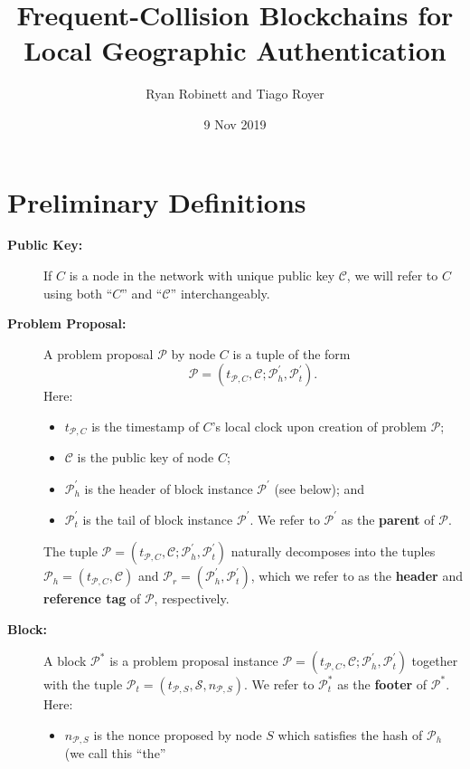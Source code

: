 \documentclass{article}
\title{Frequent-Collision Blockchains for Local Geographic Authentication}
\author{Ryan Robinett and Tiago Royer}
\date{9 Nov 2019}
\begin{document}
\maketitle

\section*{Preliminary Definitions}
\begin{description}
	\item[\textbf{Public Key:}] If $C$ is a node in the network with unique public key
		$\mathcal{C}$, we will refer to $C$ using both ``$C$'' and ``$\mathcal{C}$''
		interchangeably.
	\item[\textbf{Problem Proposal:}] A problem proposal $\mathcal{P}$ by
		node $C$ is a tuple of the form
		$$\mathcal{P}=(t_{\mathcal{P},C},\mathcal{C};\mathcal{P}^\prime_h,\mathcal{P}^\prime_t).$$
		Here:
		\begin{itemize}
			\item $t_{\mathcal{P},C}$ is the timestamp of $C$'s local clock upon
			creation of problem $\mathcal{P}$;
			\item $\mathcal{C}$ is the public key of node $C$;
			\item $\mathcal{P}^\prime_h$ is the header of block instance
			$\mathcal{P}^\prime$ (see below); and
			\item $\mathcal{P}^\prime_t$ is the tail of block instance
			$\mathcal{P}^\prime$. We refer to $\mathcal{P}^\prime$ as
			the \textbf{parent} of $\mathcal{P}$.
		\end{itemize}
		The tuple
		$\mathcal{P}=(t_{\mathcal{P},C},\mathcal{C};\mathcal{P}^\prime_h,\mathcal{P}^\prime_t)$
		naturally decomposes into the tuples
		$\mathcal{P}_h=(t_{\mathcal{P},C},\mathcal{C})$ and
		$\mathcal{P}_r=(\mathcal{P}^\prime_h,\mathcal{P}^\prime_t)$, which we
		refer to as the \textbf{header} and \textbf{reference tag} of $\mathcal{P}$,
		respectively.
	\item[\textbf{Block:}] A block $\mathcal{P}^*$ is a problem proposal instance
		$\mathcal{P}=(t_{\mathcal{P},C},\mathcal{C};\mathcal{P}^\prime_h,\mathcal{P}^\prime_t)$
		together with the tuple $\mathcal{P}_t=(t_{\mathcal{P},S},\mathcal{S},n_{\mathcal{P},S})$.
		We refer to $\mathcal{P}^*_t$ as the \textbf{footer} of $\mathcal{P}^*$. Here:
		\begin{itemize}
			\item $n_{\mathcal{P},S}$ is the nonce proposed by node $S$ which
				satisfies the hash of $\mathcal{P}_h$ (we call this ``the''

\end{itemize}
\end{description}
\end{document}
